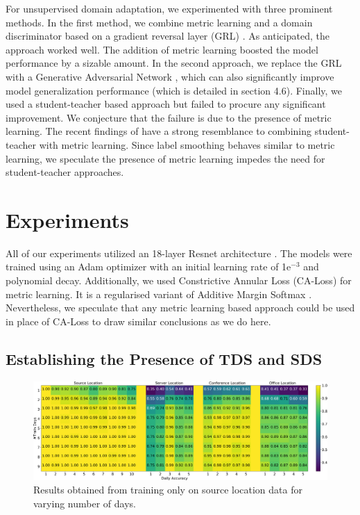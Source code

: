 \documentclass{article}
\begin{document}
For unsupervised domain adaptation, we experimented with three prominent methods. In the first method, we combine metric learning and a domain discriminator based on a gradient reversal layer (GRL) \cite{ganin2016domain}. As anticipated, the approach worked well. The addition of metric learning boosted the model performance by a sizable amount. In the second approach, we replace the GRL with a Generative Adversarial Network \cite{goodfellow2014generative}, which can also significantly improve model generalization performance (which is detailed in section 4.6). Finally, we used a student-teacher based approach \cite{meng2018adversarial} but failed to procure any significant improvement. We conjecture that the failure is due to the presence of metric learning. The recent findings of  \cite{muller2019does} have a strong resemblance to combining student-teacher with metric learning. Since label smoothing behaves similar to metric learning, we speculate the presence of metric learning impedes the need for student-teacher approaches.

\section{Experiments}
All of our experiments utilized an 18-layer Resnet architecture \cite{he2016deep}. The models were trained using an Adam optimizer \cite{kingma2014adam} with an initial learning rate of 1e$^{-3}$ and polynomial decay\footnotemark[\value{footnote}]. Additionally, we used Constrictive Annular Loss (CA-Loss) \cite{liu2019learning} for metric learning. It is a regularised variant of Additive Margin Softmax  \cite{wang2018additive}. Nevertheless, we speculate that any metric learning based approach could be used in place of CA-Loss to draw similar conclusions as we do here.

\subsection{Establishing the Presence of TDS and SDS}
\label{pres}

\begin{figure}[ht]
\includegraphics[width=1\linewidth]{figures/Exp1.png} 
\caption{Results obtained from training only on source location data for varying number of days.}
\label{src}
\end{figure}
\end{document}
